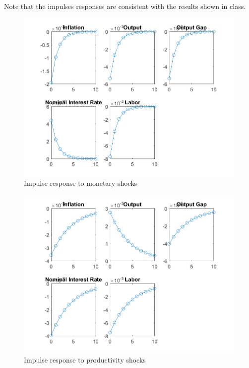 \documentclass[12pt]{article}
\theoremstyle{definition}
\begin{document}
Note that the impulses responses are consistent with the results shown in class.
\begin{figure}[H]
	\centering
	\includegraphics[width=\linewidth, height=0.4\textheight]{impulse_monetary}
	\caption{Impulse response to monetary shocks}
	\label{fig:impulse_monetary}
\end{figure}
\begin{figure}[H]
	\centering
	\includegraphics[width=\linewidth, height=0.4\textheight]{impulse_prod}
	\caption{Impulse response to productivity shocks}
	\label{fig:impulse_prod}
\end{figure}
\end{document}

